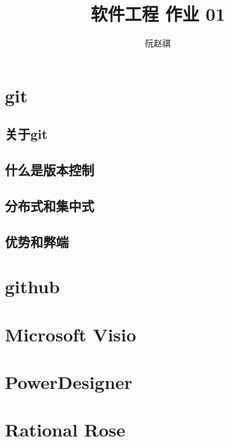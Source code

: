 \documentclass{article}
\title{软件工程 作业 01}
\author{阮赵祺}
\begin{document}
	\maketitle
	\section{git}
	\subsection{关于git}
	\subsection{什么是版本控制}
	\subsection{分布式和集中式}
	\subsection{优势和弊端}
	\section{github}
	\section{Microsoft Visio}
	\section{PowerDesigner}
	\section{Rational Rose}
\end{document}
